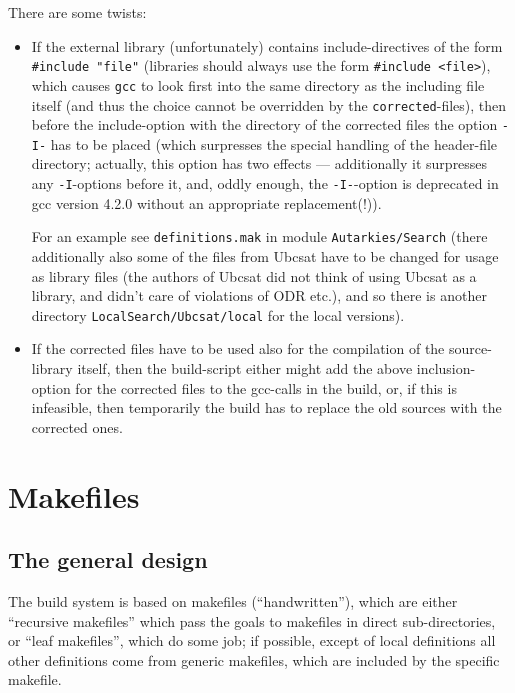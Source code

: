 \documentclass{book}
\newcommand{\filename}[1]{\texttt{#1}}
\newcommand{\name}[1]{\texttt{#1}}
\begin{document}
There are some twists:
\begin{itemize}
\item If the external library (unfortunately) contains include-directives of the form \verb|#include "file"| (libraries should always use the form \verb|#include <file>|), which causes \name{gcc} to look first into the same directory as the including file itself (and thus the choice cannot be overridden by the \filename{corrected}-files), then before the include-option with the directory of the corrected files the option \texttt{-I-} has to be placed (which surpresses the special handling of the header-file directory; actually, this option has two effects --- additionally it surpresses any \texttt{-I}-options before it, and, oddly enough, the \texttt{-I-}-option is deprecated in gcc version 4.2.0 without an appropriate replacement(!)).

  For an example see \filename{definitions.mak} in module \name{Autarkies/Search} (there additionally also some of the files from Ubcsat have to be changed for usage as library files (the authors of Ubcsat did not think of using Ubcsat as a library, and didn't care of violations of ODR etc.), and so there is another directory \filename{LocalSearch/Ubcsat/local} for the local versions).
\item If the corrected files have to be used also for the compilation of the source-library itself, then the build-script either might add the above inclusion-option for the corrected files to the gcc-calls in the build, or, if this is infeasible, then temporarily the build has to replace the old sources with the corrected ones.
\end{itemize}






\chapter{Makefiles}
\label{cha:makefile}


\section{The general design}
\label{sec:Makefilesgeneraldesign}

The build system is based on makefiles (``handwritten''), which are either ``recursive makefiles'' which pass the goals to makefiles in direct sub-directories, or ``leaf makefiles'', which do some job; if possible, except of local definitions all other definitions come from generic makefiles, which are included by the specific makefile.
\end{document}
